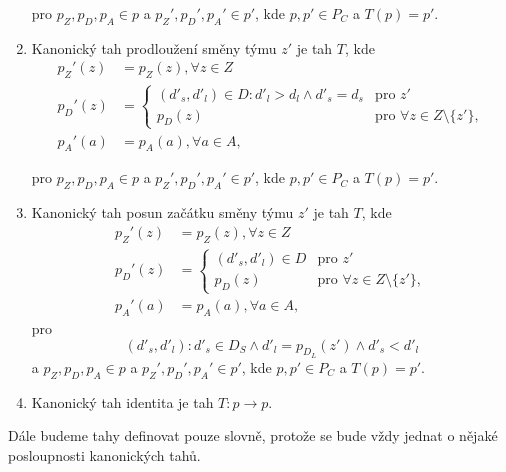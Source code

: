 \begin{definice}
\begin{enumerate}
      pro $p_Z, p_D, p_A \in p$ a $p_Z', p_D', p_A' \in p'$, kde $p, p' \in P_C$ a $T(p) = p'$.

    \item
      Kanonický tah prodloužení směny týmu $z'$ je tah $T$, kde
      \begin{align*}
        p_Z'(z) &= p_Z(z), \forall z \in Z \\
        p_D'(z) &=
          \begin{cases}
            (d'_s, d'_l) \in D \colon d'_l > d_l \land d'_s = d_s  & \text{pro $z'$} \\
            p_D(z) & \text{pro $\forall z \in Z \setminus \{ z' \}$},
          \end{cases}
          \\
        p_A'(a) &= p_A(a), \forall a \in A,
      \end{align*}

      pro $p_Z, p_D, p_A \in p$ a $p_Z', p_D', p_A' \in p'$, kde $p, p' \in P_C$ a $T(p) = p'$.

    \item
      Kanonický tah posun začátku směny týmu $z'$ je tah $T$, kde
      \begin{align*}
        p_Z'(z) &= p_Z(z), \forall z \in Z \\
        p_D'(z) &=
          \begin{cases}
            (d'_s, d'_l) \in D   & \text{pro $z'$} \\
            p_D(z) & \text{pro $\forall z \in Z \setminus \{ z' \}$},
          \end{cases}
          \\
        p_A'(a) &= p_A(a), \forall a \in A,
      \end{align*}
      pro
      \begin{equation*}
        (d'_s, d'_l) \colon d'_s \in D_S \land d'_l = p_{D_L}(z') \land d'_s < d'_l
      \end{equation*}
      a $p_Z, p_D, p_A \in p$ a $p_Z', p_D', p_A' \in p'$, kde $p, p' \in P_C$ a $T(p) = p'$.

    \item
      Kanonický tah identita je tah $T: p \rightarrow p$.
  \end{enumerate}

\end{definice}

Dále budeme tahy definovat pouze slovně, protože se bude vždy jednat o nějaké posloupnosti kanonických tahů.

